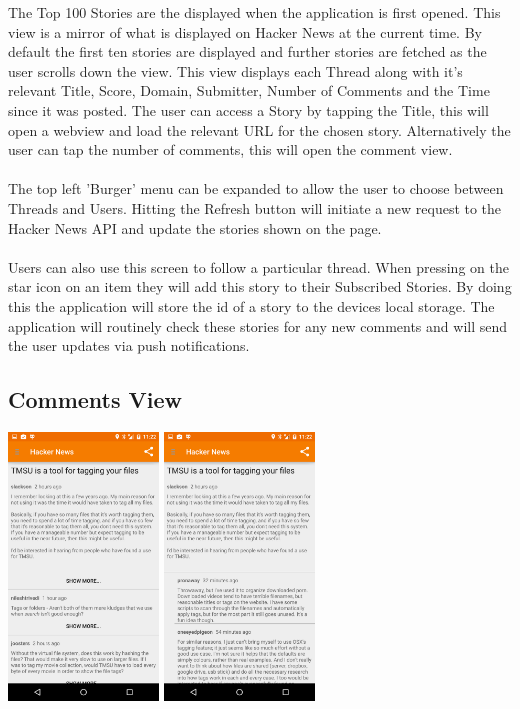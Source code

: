 \documentclass[11pt]{article}
\begin{document}
The Top 100 Stories are the displayed when the application is first opened. This view is a mirror of what is displayed on Hacker News at the current time. By default the first ten stories are displayed and further stories are fetched as the user scrolls down the view. This view displays each Thread along with it's relevant Title, Score, Domain, Submitter, Number of Comments and the Time since it was posted. The user can access a Story by tapping the Title, this will open a webview and load the relevant URL for the chosen story. Alternatively the user can tap the number of comments, this will open the comment view.
\\
\\
The top left 'Burger' menu can be expanded to allow the user to choose between Threads and Users. Hitting the Refresh button will initiate a new request to the Hacker News API and update the stories shown on the page.
\\
\\
Users can also use this screen to follow a particular thread. When pressing on the star icon on an item they will add this story to their Subscribed Stories. By doing this the application will store the id of a story to the devices local storage. The application will routinely check these stories for any new comments and will send the user updates via push notifications.
\\

\subsection*{Comments View}

\begin{center}
\includegraphics[width=0.3\textwidth]{comments.png}
\includegraphics[width=0.3\textwidth]{commentsExpanded.png}
\end{center}
\end{document}
